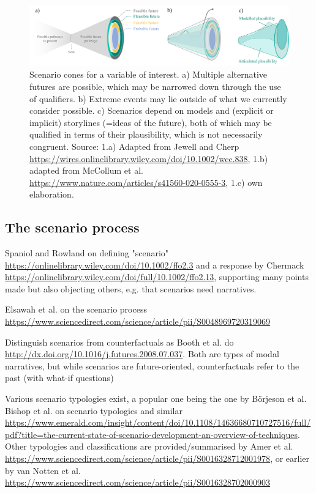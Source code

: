 \documentclass{article}
\begin{document}
\begin{refsection}
\begin{figure} [ht]
    \includegraphics[width=\textwidth]{Cones_plausibility.png} 
    \caption[Some caption for list of figures]{Scenario cones for a variable of interest. a) Multiple alternative futures are possible, which may be narrowed down through the use of qualifiers. b) Extreme events may lie outside of what we currently consider possible. c) Scenarios depend on models and (explicit or implicit) storylines (=ideas of the future), both of which may be qualified in terms of their plausibility, which is not necessarily congruent. 
    Source: 1.a) Adapted from Jewell and Cherp \url{https://wires.onlinelibrary.wiley.com/doi/10.1002/wcc.838}, 1.b) adapted from McCollum et al. \url{https://www.nature.com/articles/s41560-020-0555-3}, 1.c) own elaboration.}  
    \label{fig:plausibility}
\end{figure}


\subsection{The scenario process}

Spaniol and Rowland on defining "scenario" \url{https://onlinelibrary.wiley.com/doi/10.1002/ffo2.3} and a response by Chermack \url{https://onlinelibrary.wiley.com/doi/full/10.1002/ffo2.13}, supporting many points made but also objecting others, e.g. that scenarios need narratives.

Elsawah et al. on the scenario process \url{https://www.sciencedirect.com/science/article/pii/S0048969720319069}

Distinguish scenarios from counterfactuals as Booth et al. do \url{http://dx.doi.org/10.1016/j.futures.2008.07.037}. Both are types of modal narratives, but while scenarios are future-oriented, counterfactuals refer to the past (with what-if questions)

Various scenario typologies exist, a popular one being the one by Börjeson et al. Bishop et al. on scenario typologies and similar \url{https://www.emerald.com/insight/content/doi/10.1108/14636680710727516/full/pdf?title=the-current-state-of-scenario-development-an-overview-of-techniques}. Other typologies and classifications are provided/summarised by Amer et al. \url{https://www.sciencedirect.com/science/article/pii/S0016328712001978}, or earlier by van Notten et al. \url{https://www.sciencedirect.com/science/article/pii/S0016328702000903}


\end{refsection}
\end{document}
